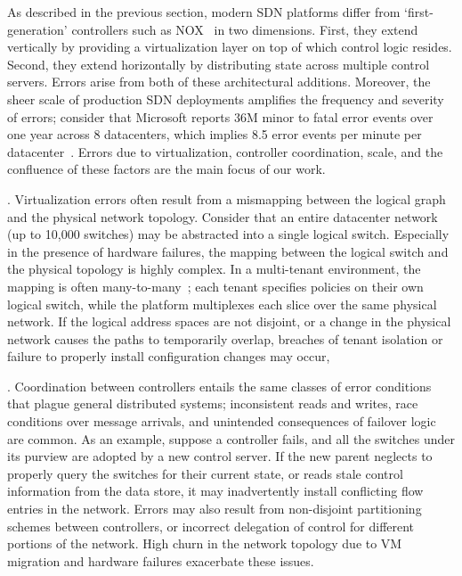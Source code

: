 As described in the previous section, modern SDN platforms differ from
`first-generation' controllers such as NOX~\cite{nox} in two dimensions. 
First, they extend vertically by providing a virtualization layer on top of
which control logic resides. Second, they extend horizontally by
distributing state across multiple control servers. Errors arise from both of
these architectural additions. Moreover, the sheer scale of production
SDN deployments amplifies the
frequency and severity of errors; consider that Microsoft reports 36M 
minor to fatal error events over one year across 8 datacenters,
which implies 8.5 error events per minute per
datacenter~\cite{Greenberg:2009:VSF:1592568.1592576}. Errors due to virtualization,
controller coordination, scale, and the confluence of these factors are the main
focus of our work.

. Virtualization errors often result from a
mismapping between the logical
graph and the physical network topology. Consider that an entire datacenter
network (up to 10,000 switches) may be abstracted into a single logical switch. Especially in the
presence of hardware failures, the mapping between the logical switch and the
physical topology is highly complex. In a multi-tenant environment, the mapping is often
many-to-many~\cite{Casado:2010:VNF:1921151.1921162}; each tenant specifies
policies on their own logical switch, while the platform multiplexes each
slice over the same physical network. If the logical address
spaces are not disjoint, or a change in the physical network causes the paths
to temporarily overlap, breaches of tenant isolation or failure to properly
install configuration changes may occur,

. Coordination between controllers
entails the same classes of error
conditions that plague general distributed systems; inconsistent reads and
writes, race conditions over message arrivals, and unintended consequences of failover
logic are common. As an example, suppose a controller fails, and all the
switches under its purview are adopted by a new control server. If the new parent
neglects to properly query the switches for their current state, or reads
stale control information from the data store, it may inadvertently install
conflicting flow entries in the network. Errors may also result 
from non-disjoint partitioning
schemes between controllers, or incorrect delegation of control for different
portions of the network. 
High churn in the network topology due to VM migration and
hardware failures exacerbate these issues.

